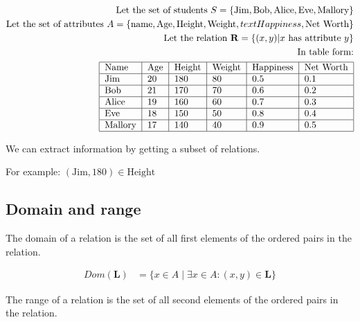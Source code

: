\documentclass{article}
\begin{document}
\begin{align*}
    \text{Let the set of students } S   = \{\text{Jim}, \text{Bob}, \text{Alice}, \text{Eve}, \text{Mallory}\}                         \\
    \text{Let the set of attributes } A = \{\text{name}, \text{Age}, \text{Height}, \text{Weight}, text{Happiness}, \text{Net Worth}\} \\
    \text{Let the relation } \mathbf{R} = \{(x, y) | x \text{ has attribute } y\}                                                      \\
    \text{In table form:}                                                                                                              \\
    \begin{tabular}{|l|l|l|l|l|l|l|}
        \hline
        Name    & Age & Height & Weight & Happiness & Net Worth \\
        \hline
        Jim     & 20  & 180    & 80     & 0.5       & 0.1       \\
        \hline
        Bob     & 21  & 170    & 70     & 0.6       & 0.2       \\
        \hline
        Alice   & 19  & 160    & 60     & 0.7       & 0.3       \\
        \hline
        Eve     & 18  & 150    & 50     & 0.8       & 0.4       \\
        \hline
        Mallory & 17  & 140    & 40     & 0.9       & 0.5       \\
        \hline
    \end{tabular}
\end{align*}

We can extract information by getting a subset of relations.

For example: $(\text{Jim}, \text{180}) \in \text{Height}$

\subsection{Domain and range}

The domain of a relation is the set of all first elements of the ordered pairs in the relation.

\begin{align*}
    Dom(\mathbf{L}) & = \{x \in A \mid \exists x \in A : (x, y) \in \mathbf{L}\}
\end{align*}

The range of a relation is the set of all second elements of the ordered pairs in the relation.
\end{document}
